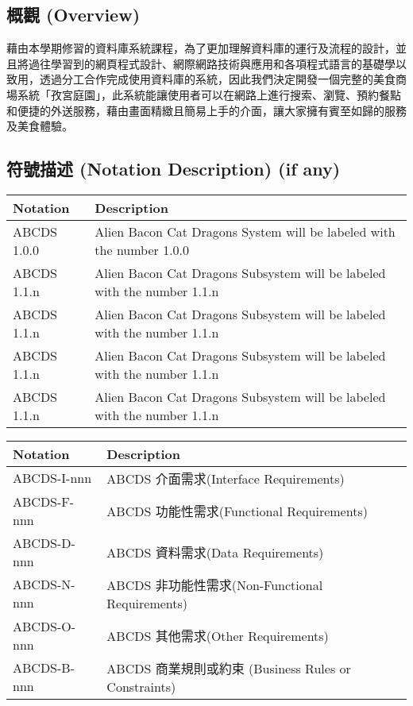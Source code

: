 \documentclass[a4paper, 12pt]{article}
\begin{document}
\subsection{概觀 (Overview)}

藉由本學期修習的資料庫系統課程，為了更加理解資料庫的運行及流程的設計，並且將過往學習到的網頁程式設計、網際網路技術與應用和各項程式語言的基礎學以致用，透過分工合作完成使用資料庫的系統，因此我們決定開發一個完整的美食商場系統「孜宮庭園」，此系統能讓使用者可以在網路上進行搜索、瀏覽、預約餐點和便捷的外送服務，藉由畫面精緻且簡易上手的介面，讓大家擁有賓至如歸的服務及美食體驗。


\subsection{符號描述 (Notation Description) (if any)}

\newcommand{\notationDescTableCol}{ | p{6.5em} | p{32em} |}

\noindent \begin{tabular}{\notationDescTableCol}
  \hline
  Notation & Description \\
  \hline
  ABCDS 1.0.0 & Alien Bacon Cat Dragons System will be labeled with the number 1.0.0 \\
  ABCDS 1.1.n & Alien Bacon Cat Dragons Subsystem will be labeled with the number 1.1.n \\
  ABCDS 1.1.n & Alien Bacon Cat Dragons Subsystem will be labeled with the number 1.1.n \\
  ABCDS 1.1.n & Alien Bacon Cat Dragons Subsystem will be labeled with the number 1.1.n \\
  ABCDS 1.1.n & Alien Bacon Cat Dragons Subsystem will be labeled with the number 1.1.n \\
  \hline
\end{tabular} \par

\noindent \begin{tabular}{\notationDescTableCol}
  \hline
  Notation & Description \\
  \hline
  ABCDS-I-nnn & ABCDS 介面需求(Interface Requirements) \\
  ABCDS-F-nnn & ABCDS 功能性需求(Functional Requirements) \\
  ABCDS-D-nnn & ABCDS 資料需求(Data Requirements) \\
  ABCDS-N-nnn & ABCDS 非功能性需求(Non-Functional Requirements) \\
  ABCDS-O-nnn & ABCDS 其他需求(Other Requirements) \\
  ABCDS-B-nnn & ABCDS 商業規則或約束 (Business Rules or Constraints) \\
  \hline
\end{tabular} \par
\end{document}
